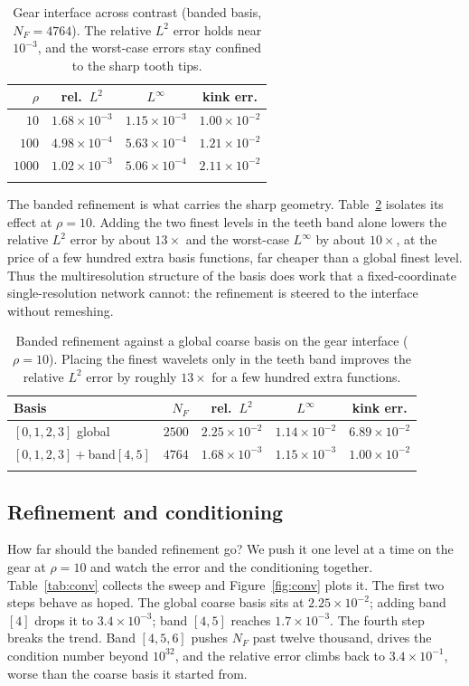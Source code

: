 \documentclass[pdflatex,sn-mathphys-num]{sn-jnl}%
\theoremstyle{thmstyleone}%
\theoremstyle{thmstyletwo}%
\theoremstyle{thmstylethree}%
\begin{document}
\begin{table}[t]
\caption{Gear interface across contrast (banded basis, $N_F=4764$). The relative $L^2$ error holds near $10^{-3}$, and the worst-case errors stay confined to the sharp tooth tips.}\label{tab:gear-contrast}%
\begin{tabular}{@{}rccc@{}}
\toprule
$\rho$ & rel.\ $L^2$ & $L^\infty$ & kink err. \\
\midrule
$10$    & $1.68\times10^{-3}$ & $1.15\times10^{-3}$ & $1.00\times10^{-2}$ \\
$100$   & $4.98\times10^{-4}$ & $5.63\times10^{-4}$ & $1.21\times10^{-2}$ \\
$1000$  & $1.02\times10^{-3}$ & $5.06\times10^{-4}$ & $2.11\times10^{-2}$ \\
\botrule
\end{tabular}
\end{table}

The banded refinement is what carries the sharp geometry. Table~\ref{tab:gear-band} isolates its effect at $\rho=10$. Adding the two finest levels in the teeth band alone lowers the relative $L^2$ error by about $13\times$ and the worst-case $L^\infty$ by about $10\times$, at the price of a few hundred extra basis functions, far cheaper than a global finest level. Thus the multiresolution structure of the basis does work that a fixed-coordinate single-resolution network cannot: the refinement is steered to the interface without remeshing.

\begin{table}[t]
\caption{Banded refinement against a global coarse basis on the gear interface ($\rho=10$). Placing the finest wavelets only in the teeth band improves the relative $L^2$ error by roughly $13\times$ for a few hundred extra functions.}\label{tab:gear-band}%
\begin{tabular}{@{}lrccc@{}}
\toprule
Basis & $N_F$ & rel.\ $L^2$ & $L^\infty$ & kink err. \\
\midrule
$[0,1,2,3]$ global & $2500$ & $2.25\times10^{-2}$ & $1.14\times10^{-2}$ & $6.89\times10^{-2}$ \\
$[0,1,2,3]+$band$[4,5]$ & $4764$ & $1.68\times10^{-3}$ & $1.15\times10^{-3}$ & $1.00\times10^{-2}$ \\
\botrule
\end{tabular}
\end{table}

\subsection{Refinement and conditioning}\label{subsec:conv}
How far should the banded refinement go? We push it one level at a time on the gear at $\rho=10$ and watch the error and the conditioning together. Table~\ref{tab:conv} collects the sweep and Figure~\ref{fig:conv} plots it. The first two steps behave as hoped. The global coarse basis sits at $2.25\times10^{-2}$; adding band $[4]$ drops it to $3.4\times10^{-3}$; band $[4,5]$ reaches $1.7\times10^{-3}$. The fourth step breaks the trend. Band $[4,5,6]$ pushes $N_F$ past twelve thousand, drives the condition number beyond $10^{32}$, and the relative error climbs back to $3.4\times10^{-1}$, worse than the coarse basis it started from.
\end{document}
